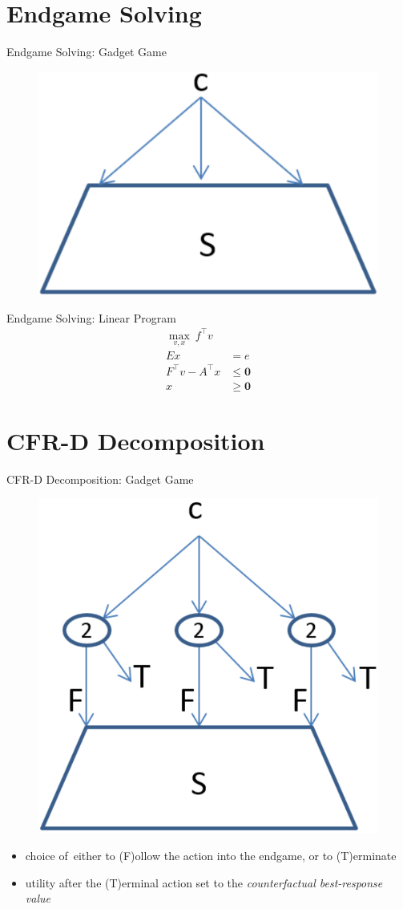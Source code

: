 \documentclass{beamer}
\theoremstyle{definition}
\newcommand{\vect}[1]{\boldsymbol{#1}}
\begin{document}
  \section{Endgame Solving}
  \begin{frame}{Endgame Solving: Gadget Game}
    \begin{figure}
      \centering
      \includegraphics[width=.5\textwidth]{../img/endgame-solving-gadget.png}
    \end{figure}
  \end{frame}

  \begin{frame}{Endgame Solving: Linear Program}
    \begin{equation*}
      \label{lp:endgame-solving}
      \begin{split}
        \max_{v, x}\  f^\top v & \\
        Ex &= e \\
        F^\top v - A^\top x &\le \vect{0} \\
        x &\ge \vect{0}
      \end{split}
    \end{equation*}
  \end{frame}

  \section{CFR-D Decomposition}
  \begin{frame}{CFR-D Decomposition: Gadget Game}
    \begin{figure}[H]
      \centering
      \includegraphics[width=.4\textwidth]{../img/re-solving-game-gadget.png}
    \end{figure}
    \pause

    \begin{itemize}[<+- | alert@+>]
      \item choice of~either to (F)ollow the action into the endgame, or to (T)erminate
      \item utility after the (T)erminal action set to the \emph{counterfactual best-response value}
    \end{itemize}
  \end{frame}
\end{document}
